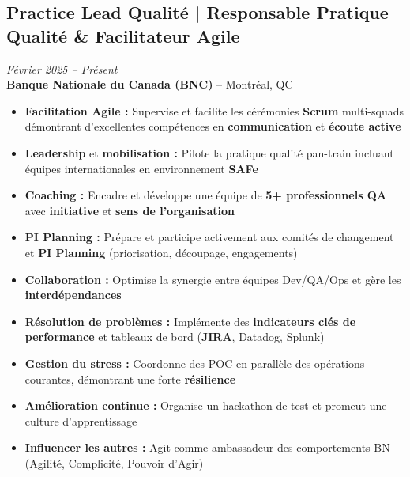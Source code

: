 \documentclass[11pt,a4paper]{article}
\newcommand{\highlight}[1]{\textcolor{primaryblue}{\textbf{#1}}}
\newcommand{\keypoint}[1]{\textbf{#1}}
\begin{document}
\subsection*{Practice Lead Qualité | Responsable Pratique Qualité \& Facilitateur Agile} \hfill \textit{\color{mediumgray}Février 2025 -- Présent}\\
\textcolor{primaryblue}{\textbf{Banque Nationale du Canada (BNC)}} -- Montréal, QC
\begin{itemize}[leftmargin=22pt]
    \item \highlight{Facilitation Agile :} Supervise et facilite les cérémonies \highlight{Scrum} multi-squads démontrant d'excellentes compétences en \highlight{communication} et \highlight{écoute active}
    \item \highlight{Leadership} et \highlight{mobilisation :} Pilote la pratique qualité pan-train incluant équipes internationales en environnement \highlight{SAFe}
    \item \highlight{Coaching :} Encadre et développe une équipe de \keypoint{5+ professionnels QA} avec \highlight{initiative} et \highlight{sens de l'organisation}
    \item \highlight{PI Planning :} Prépare et participe activement aux comités de changement et \highlight{PI Planning} (priorisation, découpage, engagements)
    \item \highlight{Collaboration :} Optimise la synergie entre équipes Dev/QA/Ops et gère les \highlight{interdépendances}
    \item \highlight{Résolution de problèmes :} Implémente des \highlight{indicateurs clés de performance} et tableaux de bord (\highlight{JIRA}, Datadog, Splunk)
    \item \highlight{Gestion du stress :} Coordonne des POC en parallèle des opérations courantes, démontrant une forte \highlight{résilience}
    \item \highlight{Amélioration continue :} Organise un hackathon de test et promeut une culture d'apprentissage
    \item \highlight{Influencer les autres :} Agit comme ambassadeur des comportements BN (Agilité, Complicité, Pouvoir d'Agir)
\end{itemize}
\end{document}
